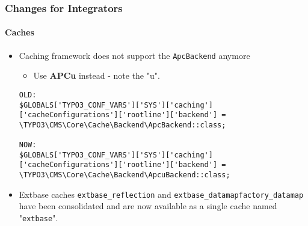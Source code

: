 \begin{frame}[fragile]
	\frametitle{Changes for Integrators}
	\framesubtitle{Caches}

	\lstset{basicstyle=\tiny\ttfamily}

	\begin{itemize}
		\item Caching framework does not support the \texttt{ApcBackend} anymore

			\begin{itemize}\smaller
				\item[\ding{228}] Use \textbf{APCu} instead - note the "u".
			\end{itemize}

\begin{lstlisting}
OLD:
$GLOBALS['TYPO3_CONF_VARS']['SYS']['caching']['cacheConfigurations']['rootline']['backend'] =
\TYPO3\CMS\Core\Cache\Backend\ApcBackend::class;

NOW:
$GLOBALS['TYPO3_CONF_VARS']['SYS']['caching']['cacheConfigurations']['rootline']['backend'] =
\TYPO3\CMS\Core\Cache\Backend\ApcuBackend::class;
\end{lstlisting}

		\item Extbase caches \texttt{extbase\_reflection} and \texttt{extbase\_datamapfactory\_datamap}
			have been consolidated and are now available as a single cache named "\texttt{extbase}".

	\end{itemize}

\end{frame}


